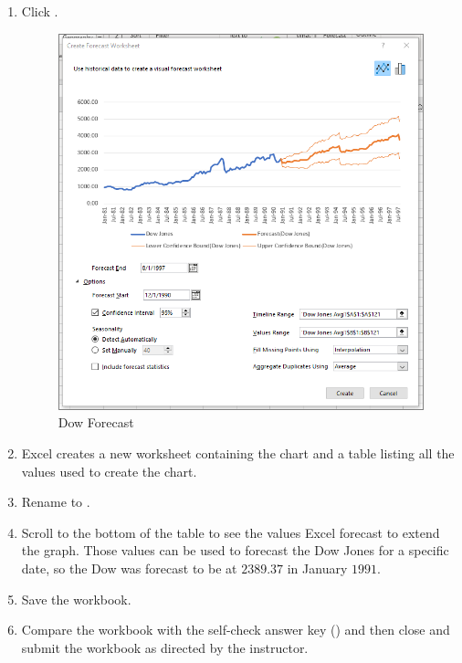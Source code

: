 \begin{enumbox}
\begin{enumerate}
		\item Click .
	
		\begin{figure}[H]
			\centering
			\includegraphics[width=\maxwidth{.95\linewidth}]{gfx/ch08_fig12}
			\caption{Dow Forecast}
			\label{08:fig12}
		\end{figure}

		\item Excel creates a new worksheet containing the chart and a table listing all the values used to create the chart.
		\item Rename  to .
		\item Scroll to the bottom of the table to see the values Excel forecast to extend the graph. Those values can be used to forecast the Dow Jones for a specific date, so the Dow was forecast to be at $ 2389.37 $ in January $ 1991 $.
		
		\item Save the  workbook.
		\item Compare the workbook with the self-check answer key () and then close and submit the  workbook as directed by the instructor.
	
	\end{enumerate}
\end{enumbox}

